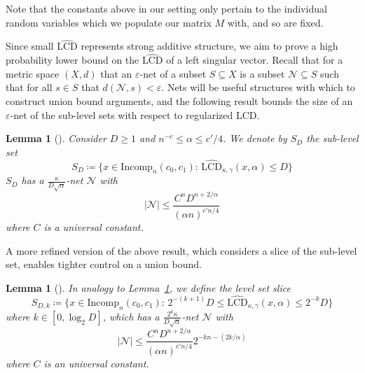 \documentclass[11pt]{article}
\numberwithin{equation}{section}
\newtheorem{lemma}[theorem]{Lemma}
\theoremstyle{remark}
\newcommand{\Incomp}{\mathrm{Incomp}}
\newcommand{\rLCD}{\widehat{\mathrm{LCD}}}
\newcommand{\net}{\mathcal{N}}
\begin{document}
Note that the constants above in our setting only pertain to the individual random variables which we populate our matrix $M$ with, and so are fixed.

 Since small $\rLCD$ represents strong additive structure, we aim to prove a high probability lower bound on the $\rLCD$ of a left singular vector. Recall that for a metric space $(X, d)$ that an $\varepsilon$-net of a subset $S \subseteq X$ is a subset $\mathcal{N} \subseteq S$ such that for all $s \in S$ that $d(\mathcal{N}, s) < \varepsilon$. Nets will be useful structures with which to construct union bound arguments, and the following result bounds the size of an $\varepsilon$-net of the sub-level sets with respect to regularized LCD.

\begin{lemma}[{\cite[Lemma B.1]{nguyen2015randommatricestailbounds}}]\label{lem-lcd-helper-level-size}
    Consider $D \geq 1$ and $n^{-c} \leq \alpha \leq c'/4$. We denote by $S_D$ the sub-level set
    \begin{equation*}
        S_D \coloneqq \bigg\{x \in \Incomp_n(c_0, c_1): \, \rLCD_{\kappa, \gamma}(x, \alpha) \leq D \bigg\}
    \end{equation*}
    $S_D$ has a $\frac{\kappa}{D\sqrt{\alpha}}$-net $\net$ with 
    \begin{equation*}
        |\net| \leq \frac{C^nD^{n + 2/\alpha}}{(\alpha n)^{c'n/4}}
    \end{equation*}
    where $C$ is a universal constant.
\end{lemma}

A more refined version of the above result, which considers a slice of the sub-level set, enables tighter control on a union bound.

\begin{lemma}[{\cite[Definition 4.6]{christoffersen2025gaps}}]\label{lem-lcd-helper-level-size-refined}
    In analogy to Lemma~\ref{lem-lcd-helper-level-size}, we define the level set slice
    \begin{equation*}
        S_{D, k} \coloneqq \bigg\{x \in \Incomp_n(c_0, c_1): \, 2^{-(k + 1)}D \leq \rLCD_{\kappa, \gamma}(x, \alpha) \leq 2^{-k}D \bigg\}
    \end{equation*}
    where $k \in [0, \log_2 D]$, which has a $\frac{2^k\kappa}{D\sqrt{\alpha}}$-net $\net$ with 
    \begin{equation*}
        |\net| \leq \frac{C^nD^{n + 2/\alpha}}{(\alpha n)^{c'n/4}} 2^{-kn - (2k/\alpha)}
    \end{equation*}
    where $C$ is an universal constant.
\end{lemma}
\end{document}
